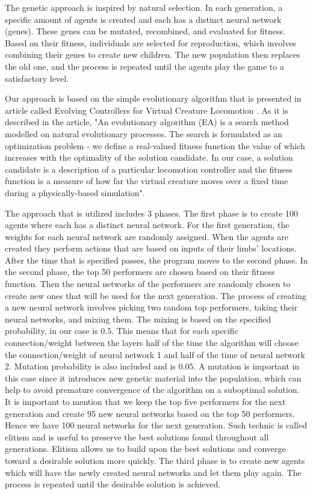 \documentclass[letterpaper]{article} %
\begin{document}
The genetic approach is inspired by natural selection. In each generation, a specific amount of agents is created and each has a distinct neural network (genes). These genes can be mutated, recombined, and evaluated for fitness. Based on their fitness, individuals are selected for reproduction, which involves combining their genes to create new children. The new population then replaces the old one, and the process is repeated until the agents play the game to a satisfactory level. 
\par Our approach is based on the simple evolutionary algorithm that is presented in article called Evolving Controllers for Virtual Creature Locomotion \cite{sanders_lobb_riddle_2003}. As it is described in the article, "An evolutionary algorithm (EA) is a search method modelled on natural evolutionary processes. The search is formulated as an optimization problem - we define a real-valued fitness function the value of which increases with the optimality of the solution candidate. In our case, a solution candidate is a description of a particular locomotion controller and the fitness function is a measure of how far the virtual creature moves over a fixed time during a physically-based simulation"\cite{sanders_lobb_riddle_2003}.
\par The approach that is utilized includes 3 phases. The first phase is to create 100 agents where each has a distinct neural network. For the first generation, the weights for each neural network are randomly assigned. When the agents are created they perform actions that are based on inputs of their limbs' locations. After the time that is specified passes, the program moves to the second phase. In the second phase, the top 50 performers are chosen based on their fitness function. Then the neural networks of the performers are randomly chosen to create new ones that will be used for the next generation. The process of creating a new neural network involves picking two random top performers, taking their neural networks, and mixing them. The mixing is based on the specified probability, in our case is $0.5$. This means that for each specific connection/weight between the layers half of the time the algorithm will choose the connection/weight of neural network 1 and half of the time of neural network 2. Mutation probability is also included and is $0.05$. A mutation is important in this case since it introduces new genetic material into the population, which can help to avoid premature convergence of the algorithm on a suboptimal solution. It is important to mention that we keep the top five performers for the next generation and create 95 new neural networks based on the top 50 performers. Hence we have 100 neural networks for the next generation. Such technic is called elitism and is useful to preserve the best solutions found throughout all generations. Elitism allows us to build upon the best solutions and converge toward a desirable solution more quickly. The third phase is to create new agents which will have the newly created neural networks and let them play again. The process is repeated until the desirable solution is achieved.
\end{document}
